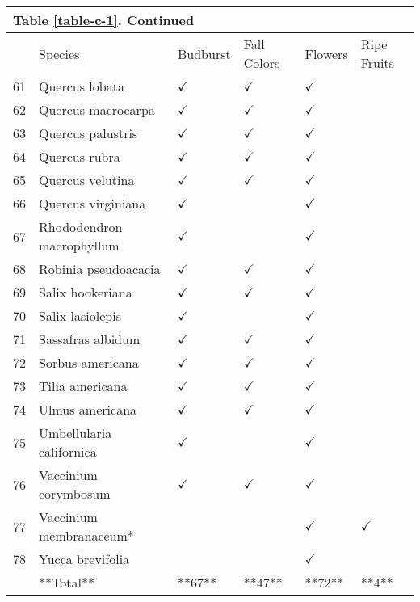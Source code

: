 
\begin{table}
\begin{tabularx}{\textwidth}{p{0.5cm}XXXXX}
\multicolumn{3}{l}{Table \ref{table-c-1}. Continued}\\
\hline
& Species & Budburst & Fall Colors & Flowers & Ripe Fruits\\
\hline
61 & Quercus lobata & $\checkmark$ & $\checkmark$ & $\checkmark$ &  \\ 
62 & Quercus macrocarpa & $\checkmark$ & $\checkmark$ & $\checkmark$ &  \\ 
63 & Quercus palustris & $\checkmark$ & $\checkmark$ & $\checkmark$ &  \\ 
64 & Quercus rubra & $\checkmark$ & $\checkmark$ & $\checkmark$ &  \\ 
65 & Quercus velutina & $\checkmark$ & $\checkmark$ & $\checkmark$ &  \\ 
66 & Quercus virginiana & $\checkmark$ &  & $\checkmark$ &  \\ 
67 & Rhododendron macrophyllum & $\checkmark$ &  & $\checkmark$ &  \\ 
68 & Robinia pseudoacacia & $\checkmark$ & $\checkmark$ & $\checkmark$ &  \\ 
69 & Salix hookeriana & $\checkmark$ & $\checkmark$ & $\checkmark$ &  \\ 
70 & Salix lasiolepis & $\checkmark$ &  & $\checkmark$ &  \\ 
71 & Sassafras albidum & $\checkmark$ & $\checkmark$ & $\checkmark$ &  \\ 
72 & Sorbus americana & $\checkmark$ & $\checkmark$ & $\checkmark$ &  \\ 
73 & Tilia americana & $\checkmark$ & $\checkmark$ & $\checkmark$ &  \\ 
74 & Ulmus americana & $\checkmark$ & $\checkmark$ & $\checkmark$ &  \\ 
75 & Umbellularia californica & $\checkmark$ &  & $\checkmark$ &  \\ 
76 & Vaccinium corymbosum & $\checkmark$ & $\checkmark$ & $\checkmark$ &  \\ 
77 & Vaccinium membranaceum* &  &  & $\checkmark$ & $\checkmark$ \\ 
78 & Yucca brevifolia &  &  & $\checkmark$ &  \\ 
 & **Total** & **67** & **47** & **72** & **4** \\ 


\hline
\end{tabularx}
\end{table}


